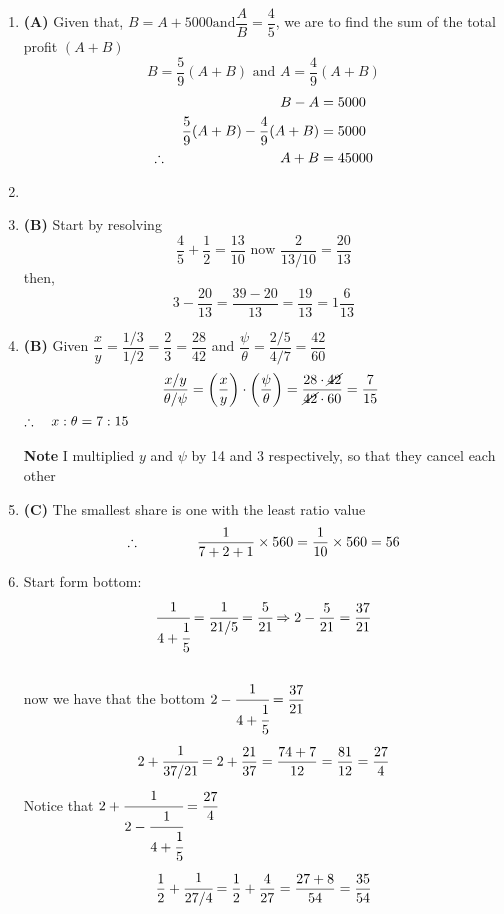 \begin{multicols}{2}
\begin{enumerate}[label={\arabic*.}]
    \item \textbf{(A) } Given that, \(B = A + 5000 \text{and} \dfrac{A}{B} = \dfrac{4}{5}\), we are to find the sum 
    of the total profit $\left( A + B\right)$
    \[B = \dfrac{5}{9}(A + B) \text{ and } A = \dfrac{4}{9}(A + B)\]
    \begin{align*}
        B - A &= 5000 \\
        \dfrac{5}{9}(A + B) - \dfrac{4}{9}(A + B) &= 5000 \\
        \therefore \hspace{80px}  A + B &= 45000
    \end{align*}
    
    \item  

    \item \textbf{(B)} Start by resolving \\
    \[ \dfrac{4}{5} + \dfrac{1}{2} = \dfrac{13}{10}\text{ now }  \dfrac{2}{13/10} = \dfrac{20}{13} \] 
    then, \\
    \[3 - \dfrac{20}{13} = \dfrac{39 - 20}{13} = \dfrac{19}{13} = 1\dfrac{6}{13} \]
    \item \textbf{(B)} Given $\dfrac{x}{y} = \dfrac{1/3}{1/2} = \dfrac{2}{3} = \dfrac{28}{42}$ and $\dfrac{\psi}{\theta} = \dfrac{2/5}{4/7} = \dfrac{42}{60}$ \\
    \[ \hspace{10px} \dfrac{x/y}{\theta / \psi} = \left(\dfrac{x}{y}\right) \cdot \left(\dfrac{\psi}{\theta}\right) = \dfrac{28 \cdot \cancel{42}}{\cancel{42} \cdot 60} = \dfrac{7}{15}  \]
    \(\therefore \hspace{10px} x:\theta = 7:15\) \\\\
    \textbf{Note} I multiplied $y$ and $\psi$ by 14 and 3 respectively, so that they cancel each other

    \item \textbf{(C)} The smallest share is one with the least ratio value \\
    \[ \therefore \hspace{40px} \dfrac{1}{7+2+1} \times 560 = \dfrac{1}{10} \times 560 = 56\]
    \item Start form bottom: \\
    \[\cfrac{1}{4 + \cfrac{1}{5}}  = \cfrac{1}{ 21/5} = \cfrac{5}{21} \Rightarrow 2 - \dfrac{5}{21} = \dfrac{37}{21}\] \\
    now we have that the bottom \(2 - \cfrac{1}{4 + \cfrac{1}{5}} = \dfrac{37}{21}\) \vspace{3pt}
    \[2 + \cfrac{ 1 }{37/21} = 2 + \dfrac{21}{37}  = \dfrac{74 + 7}{12} = \dfrac{81}{12} = \dfrac{27}{4}\]
    Notice that \(2 + \cfrac{1}{2 - \cfrac{1}{4 + \cfrac{1}{5}}} = \dfrac{27}{4}\) \vspace{3pt}
    \[\dfrac{1}{2} + \cfrac{1}{27/4} = \dfrac{1}{2} + \dfrac{4}{27} = \dfrac{27 + 8}{54} = \dfrac{35}{54} \]


\end{enumerate}
\end{multicols}
